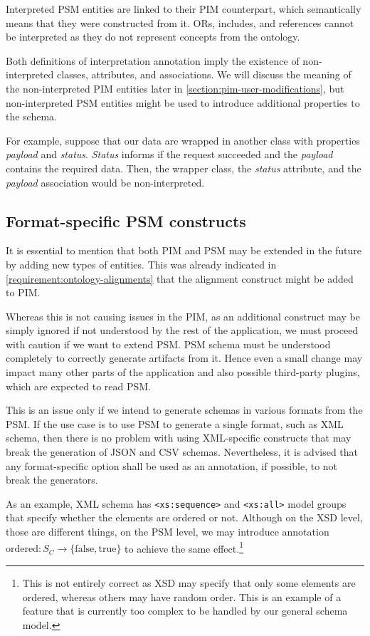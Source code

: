 Interpreted PSM entities are linked to their PIM counterpart, which semantically means that they were constructed from it. ORs, includes, and references cannot be interpreted as they do not represent concepts from the ontology.

\medskip

Both definitions of interpretation annotation imply the existence of non-interpreted classes, attributes, and associations. We will discuss the meaning of the non-interpreted PIM entities later in \autoref{section:pim-user-modifications}, but non-interpreted PSM entities might be used to introduce additional properties to the schema.

For example, suppose that our data are wrapped in another class with properties \textit{payload} and \textit{status}. \textit{Status} informs if the request succeeded and the \textit{payload} contains the required data. Then, the wrapper class, the \textit{status} attribute, and the \textit{payload} association would be non-interpreted.

\subsection{Format-specific PSM constructs}

It is essential to mention that both PIM and PSM may be extended in the future by adding new types of entities. This was already indicated in \autoref{requirement:ontology-alignments} that the alignment construct might be added to PIM.

Whereas this is not causing issues in the PIM, as an additional construct may be simply ignored if not understood by the rest of the application, we must proceed with caution if we want to extend PSM. PSM schema must be understood completely to correctly generate artifacts from it. Hence even a small change may impact many other parts of the application and also possible third-party plugins, which are expected to read PSM.

This is an issue only if we intend to generate schemas in various formats from the PSM. If the use case is to use PSM to generate a single format, such as XML schema, then there is no problem with using XML-specific constructs that may break the generation of JSON and CSV schemas. Nevertheless, it is advised that any format-specific option shall be used as an annotation, if possible, to not break the generators.

As an example, XML schema has \verb|<xs:sequence>| and \verb|<xs:all>| model groups that specify whether the elements are ordered or not. Although on the XSD level, those are different things, on the PSM level, we may introduce annotation $\textrm{ordered}: S_C \rightarrow \{\textrm{false}, \textrm{true}\}$ to achieve the same effect.\footnote{This is not entirely correct as XSD may specify that only some elements are ordered, whereas others may have random order. This is an example of a feature that is currently too complex to be handled by our general schema model.}

